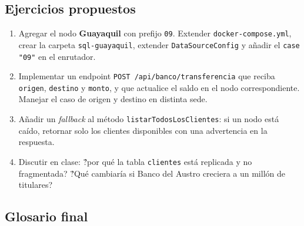 \documentclass[11pt,a4paper]{article}
\begin{document}
\subsection{Ejercicios propuestos}

\begin{enumerate}[leftmargin=1.5em]
    \item Agregar el nodo \textbf{Guayaquil} con prefijo \texttt{09}. Extender \texttt{docker-compose.yml}, crear la carpeta \texttt{sql-guayaquil}, extender \texttt{DataSourceConfig} y a\~nadir el \texttt{case "09"} en el enrutador.
    \item Implementar un endpoint \texttt{POST /api/banco/transferencia} que reciba \texttt{origen}, \texttt{destino} y \texttt{monto}, y que actualice el saldo en el nodo correspondiente. Manejar el caso de origen y destino en distinta sede.
    \item A\~nadir un \emph{fallback} al m\'etodo \texttt{listarTodosLosClientes}: si un nodo est\'a ca\'ido, retornar solo los clientes disponibles con una advertencia en la respuesta.
    \item Discutir en clase: \'?por qu\'e la tabla \texttt{clientes} est\'a replicada y no fragmentada? \'?Qu\'e cambiar\'ia si Banco del Austro creciera a un mill\'on de titulares?
\end{enumerate}

\subsection{Glosario final}
\end{document}
